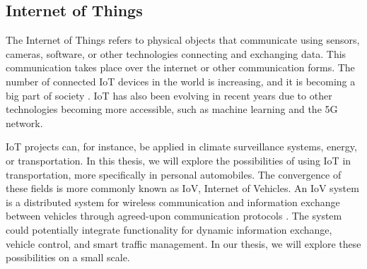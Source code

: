 \subsection{Internet of Things}

The Internet of Things refers to physical objects that communicate using sensors, cameras, software, or other technologies connecting and exchanging data. This communication takes place over the internet or other communication forms. The number of connected IoT devices in the world is increasing, and it is becoming a big part of society \parencite{iot_analytics}. IoT has also been evolving in recent years due to other technologies becoming more accessible, such as machine learning and the 5G network.

IoT projects can, for instance, be applied in climate surveillance systems, energy, or transportation. In this thesis, we will explore the possibilities of using IoT in transportation, more specifically in personal automobiles. The convergence of these fields is more commonly known as IoV, Internet of Vehicles. An IoV system is a distributed system for wireless communication and information exchange between vehicles through agreed-upon communication protocols \parencite{chinese_iov}. The system could potentially integrate functionality for dynamic information exchange, vehicle control, and smart traffic management. In our thesis, we will explore these possibilities on a small scale.